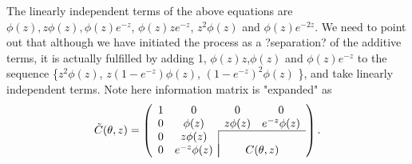 \documentclass[11pt]{amsart}
\theoremstyle{definition}
\theoremstyle{remark}
\begin{document}
The linearly independent terms of the above equations are $\phi(z), z\phi(z), \phi(z)e^{-z}$, $\phi(z)ze^{-z}$, $z^2\phi(z)$ and $ \phi(z)e^{-2z}$. We need to point out that although we have initiated the process as a ?separation? of the additive terms, it is actually fulfilled by adding 1, $\phi(z)z$,$\phi(z)$ and  $\phi(z)e^{-z}$ to the sequence \{$z^2\phi(z)$, $z(1-e^{-z})\phi(z)$, $(1-e^{-z})^2\phi(z)$ \},  and take linearly independent terms. Note here information matrix is "expanded" as
\begin{equation}
   \tilde{C}(\theta,z) = \left ( \begin{array}{cc|cc}
1& \multicolumn{1}{c}{0}&  0&  0\\
0&\multicolumn{1}{c}{\phi(z)}&z\phi(z)&  e^{-z}\phi(z)\\\cline{3-4}
0&z\phi(z) & & \\
0&e^{-z}\phi(z) &\multicolumn{2}{|c}{C(\theta,z)}
\end{array}\right).
\end{equation}
\end{document}
